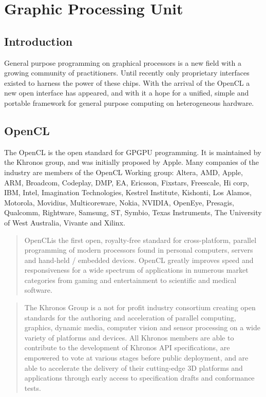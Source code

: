 %

\chapter{Graphic Processing Unit}

\section{Introduction}

General purpose programming on graphical processors is a new field with a growing community of practitioners. Until recently only proprietary interfaces existed to harness the power of these chips. With the arrival of the \gls{OpenCL} a new open interface has appeared, and with it a hope for a unified, simple and portable framework for general purpose computing on heterogeneous hardware.

\section{OpenCL}

The \gls{OpenCL} is the open standard for \gls{GPGPU} programming. It is maintained by the Khronos group, and was initially proposed by Apple. Many companies of the industry are members of the \gls{OpenCL} Working group: Altera, AMD, Apple, ARM, Broadcom, Codeplay, DMP, EA, Ericsson, Fixstars, Freescale, Hi corp, IBM, Intel, Imagination Technologies, Kestrel Institute, Kishonti, Los Alamos, Motorola, Movidius, Multicoreware, Nokia, NVIDIA, OpenEye, Presagis, Qualcomm, Rightware, Samsung, ST, Symbio, Texas Instruments, The University of West Australia, Vivante and Xilinx.
\begin{quotation}
OpenCL\texttrademark is the first open, royalty-free standard for cross-platform, parallel programming of modern processors found in personal computers, servers and hand-held / embedded devices. \gls{OpenCL} greatly improves speed and responsiveness for a wide spectrum of applications in numerous market categories from gaming and entertainment to scientific and medical software.
\end{quotation}
\begin{quotation}
The Khronos Group is a not for profit industry consortium creating open standards for the authoring and acceleration of parallel computing, graphics, dynamic media, computer vision and sensor processing on a wide variety of platforms and devices. All Khronos members are able to contribute to the development of Khronos \gls{API} specifications, are empowered to vote at various stages before public deployment, and are able to accelerate the delivery of their cutting-edge 3D platforms and applications through early access to specification drafts and conformance tests.
\end{quotation}

